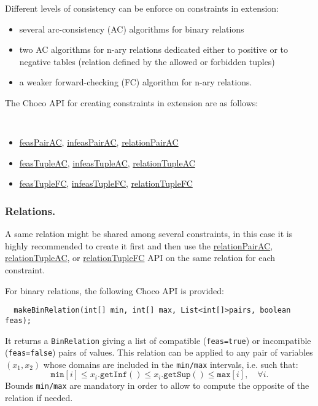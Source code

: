 Different levels of consistency can be enforce on constraints in extension: 
\begin{itemize}
\item several arc-consistency (AC) algorithms for binary relations
\item two AC algorithms for n-ary relations dedicated either to positive or to negative tables (relation defined by the allowed or forbidden tuples)
\item a weaker forward-checking (FC) algorithm for n-ary relations.
\end{itemize}

The Choco API for creating constraints in extension are as follows:
\begin{notedef}\tt
  \begin{itemize}
  \item \hyperlink{feaspairac:feaspairacconstraint}{feasPairAC}, \hyperlink{infeaspairac:infeaspairacconstraint}{infeasPairAC}, \hyperlink{relationpairac:relationpairacconstraint}{relationPairAC}
  \item \hyperlink{feastupleac:feastupleacconstraint}{feasTupleAC}, \hyperlink{infeastupleac:infeastupleacconstraint}{infeasTupleAC}, \hyperlink{relationtupleac:relationtupleacconstraint}{relationTupleAC}
  \item \hyperlink{feastuplefc:feastuplefcconstraint}{feasTupleFC}, \hyperlink{infeastuplefc:infeastuplefcconstraint}{infeasTupleFC}, \hyperlink{relationtuplefc:relationtuplefcconstraint}{relationTupleFC}
  \end{itemize}
\end{notedef}

\subsubsection{Relations.}
A same relation might be shared among several constraints, in this case it is highly recommended to create it first and then use the \hyperlink{relationpairac:relationpairacconstraint}{relationPairAC}, \hyperlink{relationtupleac:relationtupleacconstraint}{relationTupleAC}, or \hyperlink{relationtuplefc:relationtuplefcconstraint}{relationTupleFC} API  on the same relation for each constraint.

For binary relations, the following Choco API is provided:
\begin{lstlisting}
  makeBinRelation(int[] min, int[] max, List<int[]>pairs, boolean feas);
\end{lstlisting}
It returns a \texttt{BinRelation} giving a list of compatible (\texttt{feas=true}) or incompatible (\texttt{feas=false}) pairs of values. This relation can be applied to any pair of variables $(x_1,x_2)$ whose domains are included in the \texttt{min/max} intervals, i.e. such that:
$$\mathtt{min}[i] \le x_i.\mathtt{getInf}() \le x_i.\mathtt{getSup}() \le  \mathtt{max}[i],\quad \forall i.$$
Bounds \texttt{min/max} are mandatory in order to allow to compute the opposite of the relation if needed.

